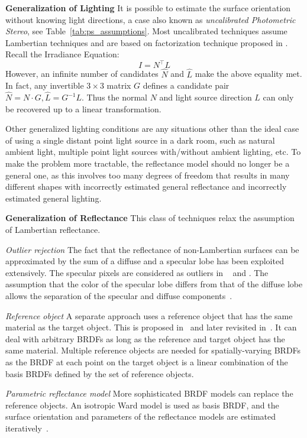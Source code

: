 \textbf{Generalization of Lighting} 
It is possible to estimate the surface orientation without knowing light directions, a case also known as \textit{uncalibrated Photometric Stereo}, see Table~\ref{tab:ps_assumptions}. Most uncalibrated techniques assume Lambertian techniques and are based on factorization technique proposed in \cite{hayakawa1994photometric}. Recall the Irradiance Equation:
$$
I=N^\top L
$$
However, an infinite number of candidates $\hat{N}$ and $\hat{L}$ make the above equality met. In fact, any invertible $3\times 3$ matrix $G$ defines a candidate pair $\hat{N} = N\cdot G, \hat{L}=G^{-1}L$. Thus the normal $N$ and light source direction $L$ can only be recovered up to a linear transformation.

Other generalized lighting conditions are any situations other than the ideal case of using a single distant point light source in a dark room, such as natural ambient light, multiple point light sources with/without ambient lighting, etc. To make the problem more tractable, the reflectance model should no longer be a general one, as this involves too many degrees of freedom that results in many different shapes with incorrectly estimated general reflectance and incorrectly estimated general lighting.

\textbf{Generalization of Reflectance} This class of techniques relax the assumption of Lambertian reflectance.

\textit{Outlier rejection} 
The fact that the reflectance of non-Lambertian surfaces can be approximated by the sum of a diffuse and a specular lobe has been exploited extensively. The specular pixels are considered as outliers in ~\cite{coleman1982obtaining} and \cite{barsky20034}. The assumption that the color of the specular lobe differs from that of the diffuse lobe allows the separation of the specular and diffuse components~\cite{mallick2005beyond,sato1994temporal,schluns1993photometric}.

\textit{Reference object}
A separate approach uses a reference object that has the same material as the target object. This is proposed in~\cite{silver1980determining} and later revisited in~\cite{hertzmann2005example}. It can deal with arbitrary BRDFs as long as the reference and target object has the same material. Multiple reference objects are needed for spatially-varying BRDFs as the BRDF at each point on the target object is a linear combination of the basis BRDFs defined by the set of reference objects. 

\textit{Parametric reflectance model} 
More sophisticated BRDF models can replace the reference objects. An isotropic Ward model is used as basis BRDF, and the surface orientation and parameters of the reflectance models are estimated iteratively~\cite{goldman2010shape}.

